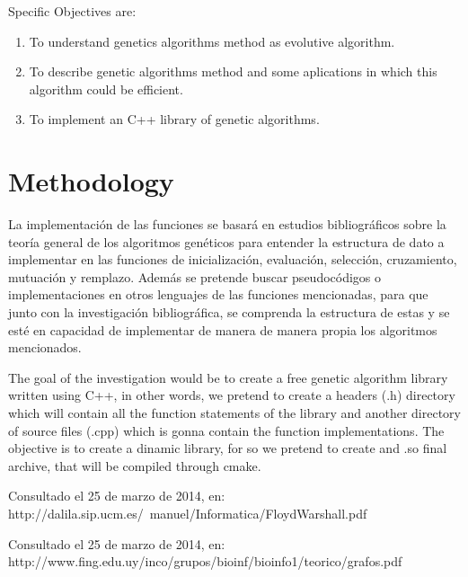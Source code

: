 \documentclass[letterpaper]{article}
\begin{document}
Specific Objectives are:\\

\begin{enumerate}
\item To understand genetics algorithms method as evolutive algorithm.
\item To describe genetic algorithms method and some aplications in which this algorithm could be efficient.
\item To implement an C++ library of genetic algorithms.
\end{enumerate}

\section{Methodology}



La implementación de las funciones se basará en estudios bibliográficos sobre la teoría general de los algoritmos genéticos para entender la estructura de dato a implementar en las funciones de inicialización, evaluación, selección, cruzamiento, mutuación y remplazo. Además se pretende buscar pseudocódigos o implementaciones en otros lenguajes de las funciones mencionadas, para que junto con la investigación bibliográfica, se comprenda la estructura de estas y se esté en capacidad de implementar de manera de manera propia los algoritmos mencionados.


The goal of the investigation would be to create a free genetic algorithm library written using C++, in other words, we pretend to create a headers (.h) directory which will contain all the function statements of the library and another directory of source files (.cpp) which is gonna contain the function implementations. The objective is to create a dinamic library, for so we pretend to create and .so final archive, that will be compiled through cmake.




\begin{thebibliography}{99}
Consultado el 25 de marzo de 2014, en: http://dalila.sip.ucm.es/~manuel/Informatica/FloydWarshall.pdf

Consultado el 25 de marzo de 2014, en: http://www.fing.edu.uy/inco/grupos/bioinf/bioinfo1/teorico/grafos.pdf

\end{thebibliography}
\end{document}

